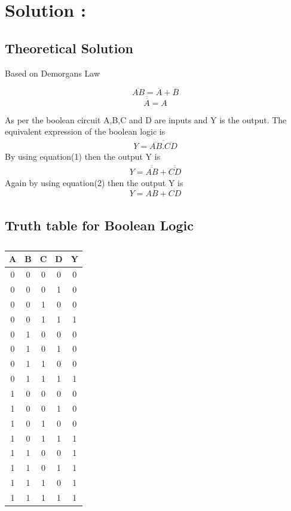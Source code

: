 \documentclass[journal,12pt,twocolumn]{IEEEtran}
\begin{document}
\section{\textbf{Solution :}}
\subsection{Theoretical Solution}
    Based on Demorgans Law
    \begin{center}
    \begin{equation}
    \overline{AB} = \overline{A}+\overline{B}
    \end{equation}
    \begin{equation}
    \overline{\overline{A}}  = A
    \end{equation}
    \end{center}
    As per the boolean circuit A,B,C and D are inputs and Y is the output. The equivalent expression of the boolean logic is \\
    \begin{align*}
    Y  = \overline{\overline{AB}.\overline{CD}}
    \end{align*}
    By using equation(1) then the output Y is
    \begin{align*}
    Y  = \overline{\overline{AB}}+\overline{\overline{CD}}
    \end{align*}
    Again by using equation(2) then the output Y is 
    \begin{align*}
    Y  = AB + CD
    \end{align*}

\subsection{Truth table for Boolean Logic}
\begin{table}[!h]
\begin{tabular}{|c|c|c|c|c|}
\hline
\centering
A & B & C & D & Y \\ 
\hline 
0 & 0 & 0 & 0 & 0\\
0 & 0 & 0 & 1 & 0\\
0 & 0 & 1 & 0 & 0\\
0 & 0 & 1 & 1 & 1\\
0 & 1 & 0 & 0 & 0\\
0 & 1 & 0 & 1 & 0\\
0 & 1 & 1 & 0 & 0\\
0 & 1 & 1 & 1 & 1\\
1 & 0 & 0 & 0 & 0\\
1 & 0 & 0 & 1 & 0\\
1 & 0 & 1 & 0 & 0\\
1 & 0 & 1 & 1 & 1\\
1 & 1 & 0 & 0 & 1\\
1 & 1 & 0 & 1 & 1\\
1 & 1 & 1 & 0 & 1\\
1 & 1 & 1 & 1 & 1\\
\hline
\end{tabular}
\centering 
\label{Truth table}
\caption{}

\end{table}
\end{document}
